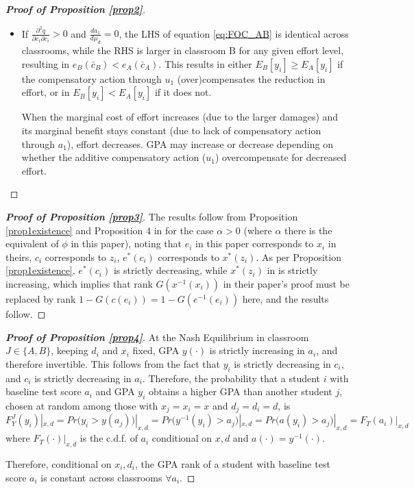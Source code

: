 \begin{proof}[{\bf Proof of Proposition \ref{prop2}}]
\begin{itemize}
     \item If $\frac{\partial^2 q}{\partial e_i \partial c_i}>0$ and $\frac{d a_1}{d \mu_d}=0$, the LHS of equation \eqref{eq:FOC_AB}  is identical across classrooms, while the RHS is larger in classroom B for any given effort level, resulting in $e_B(\bar{c}_B)< e_A(\bar{c}_A)$. This results in either $E_B[y_i]\geq E_A[y_i]$ if the compensatory action through $u_1$ (over)compensates the reduction in effort, or in $E_B[y_i]<E_A[y_i]$ if it does not.\par
     When the marginal cost of effort increases (due to the larger damages) and its marginal benefit stays constant (due to lack of compensatory action through $a_1$), effort decreases. GPA may increase or decrease depending on whether the additive compensatory action ($u_1$) overcompensate for decreased effort. 
    
    
    

    
\end{itemize}
\end{proof}


\begin{proof}[{\bf  Proof of Proposition \ref{prop3}}] The results follow from Proposition \ref{prop1existence} and Proposition 4 in \cite{hopkins2004running} for the case $\alpha>0$ (where $\alpha$ there is the equivalent of $\phi$ in this paper), noting that $e_i$ in this paper corresponds to $x_i$ in theirs, $c_i$ corresponds to $z_i$, $e^{*}(c_i)$ corresponds to $x^{*}(z_i)$. As per Proposition \ref{prop1existence}, $e^{*}(c_i)$ is strictly decreasing, while $x^{*}(z_i)$ in \cite{hopkins2004running} is strictly increasing, which implies that rank $G(x^{-1}(x_i))$ in their paper's proof must be replaced by rank $1-G(c(e_i))=1-G(e^{-1}(e_i))$ here, and the results follow.

    
\end{proof}


\begin{proof}[{\bf Proof of Proposition \ref{prop4}}] 
At the Nash Equilibrium in classroom $J\in\{A,B\}$, keeping $d_i$ and $x_i$ fixed, GPA $y(\cdot)$ is strictly increasing in $a_i$, and therefore invertible. This follows from the fact that $y_i$ is strictly decreasing in $c_i$, and $c_i$ is strictly decreasing in $a_i$. Therefore, the probability that a student $i$ with baseline test score $a_i$ and GPA $y_i$ obtains a higher GPA than another student $j$, chosen at random among those with $x_j=x_i=x$ and $d_j=d_i=d$, is $F_Y^J(y_i)|_{x,d}=Pr\big(y_i>y(a_j)\big)|_{x,d}=Pr\big(y^{-1}(y_i)>a_j\big)|_{x,d}=Pr\big(a(y_i)>a_j\big)|_{x,d}=F_T(a_i)|_{x,d}$ where $F_T(\cdot)|_{x,d}$ is the c.d.f. of $a_i$ conditional on $x,d$ and $a(\cdot)=y^{-1}(\cdot)$. \par 
Therefore, conditional on $x_i,d_i$, the GPA rank of a student with baseline test score $a_i$ is constant across classrooms $\forall a_i$.

    
\end{proof}





